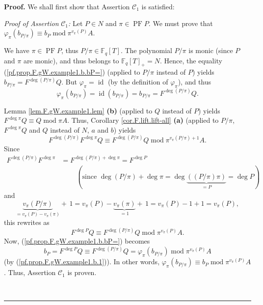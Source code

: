 \documentclass[numbers=enddot,12pt,final,onecolumn,notitlepage]{scrartcl}%
\theoremstyle{definition}
\newenvironment{proof}[1][Proof]{\noindent\textbf{#1.} }{\ \rule{0.5em}{0.5em}}
\begin{document}
\begin{proof}
We shall first show that Assertion $\mathcal{C}_{1}$ is satisfied:

\textit{Proof of Assertion }$\mathcal{C}_{1}$\textit{:} Let $P\in N$ and
$\pi\in\operatorname*{PF}P$. We must prove that $\varphi_{\pi}\left(
b_{P/\pi}\right)  \equiv b_{P}\operatorname{mod}\pi^{v_{\pi}\left(  P\right)
}A$.

We have $\pi\in\operatorname*{PF}P$, thus $P/\pi\in\mathbb{F}_{q}\left[
T\right]  $. The polynomial $P/\pi$ is monic (since $P$ and $\pi$ are monic),
and thus belongs to $\mathbb{F}_{q}\left[  T\right]  _{+}=N$. Hence, the
equality (\ref{pf.prop.F.gW.example1.b.bP=}) (applied to $P/\pi$ instead of
$P$) yields $b_{P/\pi}=F^{\deg\left(  P/\pi\right)  }Q$. But $\varphi_{\pi
}=\operatorname*{id}$ (by the definition of $\varphi_{\pi}$), and thus%
\begin{equation}
\varphi_{\pi}\left(  b_{P/\pi}\right)  =\operatorname*{id}\left(  b_{P/\pi
}\right)  =b_{P/\pi}=F^{\deg\left(  P/\pi\right)  }Q.
\label{pf.prop.F.gW.example1.b.1}%
\end{equation}


Lemma \ref{lem.F.gW.example1.lem} \textbf{(b)} (applied to $Q$ instead of $P$)
yields $F^{\deg\pi}Q\equiv Q\operatorname{mod}\pi A$. Thus, Corollary
\ref{cor.F.lift.lift-all} \textbf{(a)} (applied to $P/\pi$, $F^{\deg\pi}Q$ and
$Q$ instead of $N$, $a$ and $b$) yields%
\[
F^{\deg\left(  P/\pi\right)  }F^{\deg\pi}Q\equiv F^{\deg\left(  P/\pi\right)
}Q\operatorname{mod}\pi^{v_{\pi}\left(  P/\pi\right)  +1}A.
\]
Since%
\begin{align*}
F^{\deg\left(  P/\pi\right)  }F^{\deg\pi}  &  =F^{\deg\left(  P/\pi\right)
+\deg\pi}=F^{\deg P}\\
&  \ \ \ \ \ \ \ \ \ \ \left(  \text{since }\deg\left(  P/\pi\right)  +\deg
\pi=\deg\underbrace{\left(  \left(  P/\pi\right)  \pi\right)  }_{=P}=\deg
P\right)
\end{align*}
and
\[
\underbrace{v_{\pi}\left(  P/\pi\right)  }_{=v_{\pi}\left(  P\right)  -v_{\pi
}\left(  \pi\right)  }+\,1=v_{\pi}\left(  P\right)  -\underbrace{v_{\pi
}\left(  \pi\right)  }_{=1}+\,1=v_{\pi}\left(  P\right)  -1+1=v_{\pi}\left(
P\right)  ,
\]
this rewrites as
\[
F^{\deg P}Q\equiv F^{\deg\left(  P/\pi\right)  }Q\operatorname{mod}\pi
^{v_{\pi}\left(  P\right)  }A.
\]
Now, (\ref{pf.prop.F.gW.example1.b.bP=}) becomes%
\[
b_{P}=F^{\deg P}Q\equiv F^{\deg\left(  P/\pi\right)  }Q=\varphi_{\pi}\left(
b_{P/\pi}\right)  \operatorname{mod}\pi^{v_{\pi}\left(  P\right)  }A
\]
(by (\ref{pf.prop.F.gW.example1.b.1})). In other words, $\varphi_{\pi}\left(
b_{P/\pi}\right)  \equiv b_{P}\operatorname{mod}\pi^{v_{\pi}\left(  P\right)
}A$. Thus, Assertion $\mathcal{C}_{1}$ is proven.


\end{proof}
\end{document}

